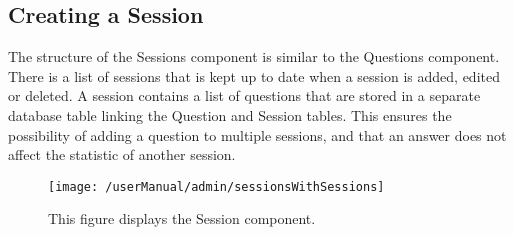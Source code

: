 \subsection{Creating a Session}
The structure of the Sessions component is similar to the Questions component. There is a list of sessions that is kept up to date when a session is added, edited or deleted. A session contains a list of questions that are stored in a separate database table linking the Question and Session tables. This ensures the possibility of adding a question to multiple sessions, and that an answer does not affect the statistic of another session.

\begin{figure}[H]
	\centering
	\texttt{[image: /userManual/admin/sessionsWithSessions]}
	\label{fig:sessionPage}
	\caption{This figure displays the Session component.}
\end{figure}
